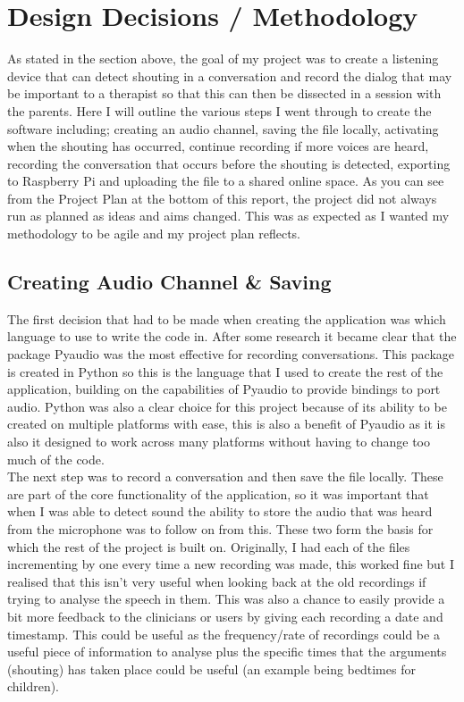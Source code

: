 \documentclass[a4paper,11pt]{report}
\begin{document}
\section{Design Decisions / Methodology}
As stated in the section above, the goal of my project was to create a listening device that can detect shouting in a conversation and record the dialog that may be important to a therapist so that this can then be dissected in a session with the parents. Here I will outline the various steps I went through to create the software including; creating an audio channel, saving the file locally, activating when the shouting has occurred, continue recording if more voices are heard, recording the conversation that occurs before the shouting is detected, exporting to Raspberry Pi and uploading the file to a shared online space. As you can see from the Project Plan at the bottom of this report, the project did not always run as planned as ideas and aims changed. This was as expected as I wanted my methodology to be agile and my project plan reflects.

\subsection{Creating Audio Channel \& Saving}
The first decision that had to be made when creating the application was which language to use to write the code in. After some research it became clear that the package Pyaudio was the most effective for recording conversations. This package is created in Python so this is the language that I used to create the rest of the application, building on the capabilities of Pyaudio to provide bindings to port audio. Python was also a clear choice for this project because of its ability to be created on multiple platforms with ease, this is also a benefit of Pyaudio as it is also it designed to work across many platforms without having to change too much of the code.\\
 
The next step was to record a conversation and then save the file locally. These are part of the core functionality of the application, so it was important that when I was able to detect sound the ability to store the audio that was heard from the microphone was to follow on from this. These two form the basis for which the rest of the project is built on. Originally, I had each of the files incrementing by one every time a new recording was made, this worked fine but I realised that this isn’t very useful when looking back at the old recordings if trying to analyse the speech in them. This was also a chance to easily provide a bit more feedback to the clinicians or users by giving each recording a date and timestamp. This could be useful as the frequency/rate of recordings could be a useful piece of information to analyse plus the specific times that the arguments (shouting) has taken place could be useful (an example being bedtimes for children).\\
\end{document}
